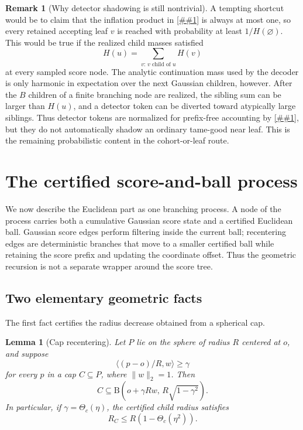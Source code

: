 \documentclass[10pt]{article}
\newcommand{\cref}[1]{\ref{##1}}
\newtheorem{lemma}[theorem]{Lemma}
\theoremstyle{definition}
\newtheorem{remark}[theorem]{Remark}
\newcommand{\Ball}{\mathrm{B}}
\newcommand{\ip}[2]{\langle #1,#2\rangle}
\begin{document}
\begin{remark}[Why detector shadowing is still nontrivial]\label{rem:detector-shadowing-obstruction}
   A tempting shortcut would be to claim that the inflation product in \cref{lem:detector-inflation} is always at most one, so every retained accepting leaf $v$ is reached with probability at least $1/H(\varnothing)$. This would be true if the realized child masses satisfied
   \[
      H(u)=\sum_{v:\,v\text{ child of }u}H(v)
   \]
   at every sampled score node. The analytic continuation mass used by the decoder is only harmonic in expectation over the next Gaussian children, however. After the $B$ children of a finite branching node are realized, the sibling sum can be larger than $H(u)$, and a detector token can be diverted toward atypically large siblings. Thus detector tokens are normalized for prefix-free accounting by \cref{lem:continuation-detector}, but they do not automatically shadow an ordinary tame-good near leaf. This is the remaining probabilistic content in the cohort-or-leaf route.
\end{remark}

\section{The certified score-and-ball process}

We now describe the Euclidean part as one branching process. A node of the process carries both a cumulative Gaussian score state and a certified Euclidean ball. Gaussian score edges perform filtering inside the current ball; recentering edges are deterministic branches that move to a smaller certified ball while retaining the score prefix and updating the coordinate offset. Thus the geometric recursion is not a separate wrapper around the score tree.

\subsection{Two elementary geometric facts}

The first fact certifies the radius decrease obtained from a spherical cap.

\begin{lemma}[Cap recentering]\label{lem:cap}
   Let $P$ lie on the sphere of radius $R$ centered at $o$, and suppose
   \[
      \ip{(p-o)/R}{w}\ge\gamma
   \]
   for every $p$ in a cap $C\subseteq P$, where $\|w\|_2=1$. Then
   \[
      C\subseteq
      \Ball\!\left(o+\gamma Rw,\,R\sqrt{1-\gamma^2}\right).
   \]
   In particular, if $\gamma=\Theta_c(\eta)$, the certified child radius satisfies
   \[
      R_C\le R(1-\Theta_c(\eta^2)).
   \]
\end{lemma}
\end{document}
